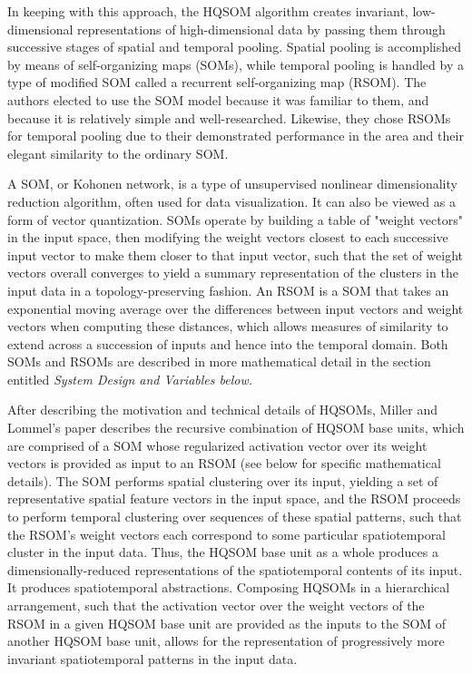 \documentclass[a4paper,10pt]{article}
\begin{document}
In keeping with this approach, the HQSOM algorithm creates invariant, low-dimensional
representations of high-dimensional data by passing them through successive stages of spatial and
temporal pooling. Spatial pooling is accomplished by means of self-organizing maps (SOMs), while
temporal pooling is handled by a type of modified SOM called a recurrent self-organizing map (RSOM).
The authors elected to use the SOM model because it was familiar to them, and because it is
relatively simple and well-researched. Likewise, they chose RSOMs for temporal pooling due to their
demonstrated performance in the area and their elegant similarity to the ordinary SOM.

A SOM, or Kohonen network, is a type of unsupervised nonlinear dimensionality reduction algorithm,
often used for data visualization. It can also be viewed as a form of vector quantization. SOMs
operate by building a table of "weight vectors" in the input space, then modifying the weight
vectors closest to each successive input vector to make them closer to that input vector, such that
the set of weight vectors overall converges to yield a summary representation of the clusters in the
input data in a topology-preserving fashion. An RSOM is a SOM that takes an exponential moving
average over the differences between input vectors and weight vectors when computing these
distances, which allows measures of similarity to extend across a succession of inputs and hence
into the temporal domain. Both SOMs and RSOMs are described in more mathematical detail in the
section entitled \em System Design and Variables \em below.

After describing the motivation and technical details of HQSOMs, Miller and Lommel's paper describes
the recursive combination of HQSOM base units, which are comprised of a SOM whose regularized
activation vector over its weight vectors is provided as input to an RSOM (see below for specific
mathematical details). The SOM performs spatial clustering over its input, yielding a set of
representative spatial feature vectors in the input space, and the RSOM proceeds to perform temporal
clustering over sequences of these spatial patterns, such that the RSOM's weight vectors each
correspond to some particular spatiotemporal cluster in the input data. Thus, the HQSOM base unit as
a whole produces a dimensionally-reduced representations of the spatiotemporal contents of its
input. It produces spatiotemporal abstractions. Composing HQSOMs in a hierarchical arrangement, such
that the activation vector over the weight vectors of the RSOM in a given HQSOM base unit are
provided as the inputs to the SOM of another HQSOM base unit, allows for the representation of
progressively more invariant spatiotemporal patterns in the input data.
\end{document}
